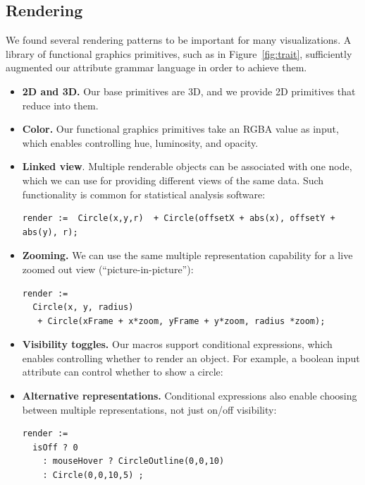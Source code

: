 \subsection{Rendering}
\label{sec:rendering}
We found several rendering patterns to be important for many visualizations. A library of functional graphics primitives, such as  in Figure~\ref{fig:trait}, sufficiently augmented our attribute grammar language in order to achieve them.

\begin{itemize}
\item \textbf{2D and 3D.} Our base primitives are 3D, and we provide 2D primitives that reduce into them. 
\item \textbf{Color.} Our functional graphics primitives take an RGBA value as input, which enables controlling hue, luminosity, and opacity.
\item \textbf{Linked view}. Multiple renderable objects can be associated with one node, which we can use for providing different views of the same data. Such functionality is common for statistical analysis software:

\begin{lstlisting}[mathescape]
render :=  Circle(x,y,r)  + Circle(offsetX + abs(x), offsetY + abs(y), r);
\end{lstlisting}

\item \textbf{Zooming.} We can use the same multiple representation capability for a live zoomed out view (``picture-in-picture''):

\begin{lstlisting}[mathescape]
render :=  
  Circle(x, y, radius) 
   + Circle(xFrame + x*zoom, yFrame + y*zoom, radius *zoom);
\end{lstlisting}

\item \textbf{Visibility toggles.} Our macros support conditional expressions, which enables controlling whether to render an object. For example, a boolean input attribute can control whether to show a circle: 
\item \textbf{Alternative representations.} Conditional expressions also enable choosing between multiple representations, not just on/off visibility:
\begin{lstlisting}[mathescape]
render := 
  isOff ? 0
    : mouseHover ? CircleOutline(0,0,10) 
    : Circle(0,0,10,5) ;
\end{lstlisting}

\end{itemize}


